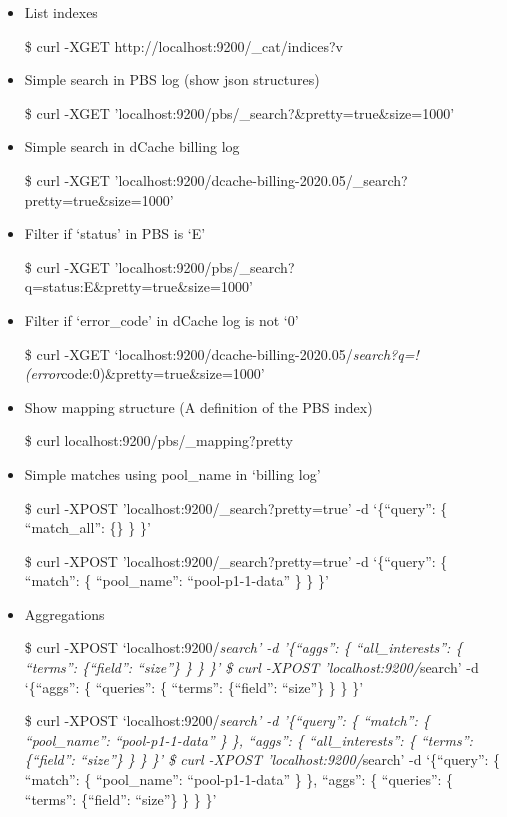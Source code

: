 \documentclass[]{article}
\begin{document}
\begin{itemize}
\item
  List indexes

  \$ curl -XGET http://localhost:9200/\_cat/indices?v
\item
  Simple search in PBS log (show json structures)

  \$ curl -XGET 'localhost:9200/pbs/\_search?\&pretty=true\&size=1000'
\item
  Simple search in dCache billing log

  \$ curl -XGET
  'localhost:9200/dcache-billing-2020.05/\_search?pretty=true\&size=1000'
\item
  Filter if `status' in PBS is `E'

  \$ curl -XGET
  'localhost:9200/pbs/\_search?q=status:E\&pretty=true\&size=1000'
\item
  Filter if `error\_code' in dCache log is not `0'

  \$ curl -XGET
  `localhost:9200/dcache-billing-2020.05/\emph{search?q=!(error}code:0)\&pretty=true\&size=1000'
\item
  Show mapping structure (A definition of the PBS index)

  \$ curl localhost:9200/pbs/\_mapping?pretty
\item
  Simple matches using pool\_name in `billing log'

  \$ curl -XPOST 'localhost:9200/\_search?pretty=true' -d `\{``query'':
  \{ ``match\_all'': \{\} \} \}'

  \$ curl -XPOST 'localhost:9200/\_search?pretty=true' -d `\{``query'':
  \{ ``match'': \{ ``pool\_name'': ``pool-p1-1-data'' \} \} \}'
\item
  Aggregations

  \$ curl -XPOST `localhost:9200/\emph{search' -d '\{``aggs'': \{
  ``all\_interests'': \{ ``terms'': \{``field'': ``size''\} \} \} \}' \$
  curl -XPOST 'localhost:9200/}search' -d `\{``aggs'': \{ ``queries'':
  \{ ``terms'': \{``field'': ``size''\} \} \} \}'

  \$ curl -XPOST `localhost:9200/\emph{search' -d '\{``query'': \{
  ``match'': \{ ``pool\_name'': ``pool-p1-1-data'' \} \}, ``aggs'': \{
  ``all\_interests'': \{ ``terms'': \{``field'': ``size''\} \} \} \}' \$
  curl -XPOST 'localhost:9200/}search' -d `\{``query'': \{ ``match'': \{
  ``pool\_name'': ``pool-p1-1-data'' \} \}, ``aggs'': \{ ``queries'': \{
  ``terms'': \{``field'': ``size''\} \} \} \}'
\end{itemize}
\end{document}
